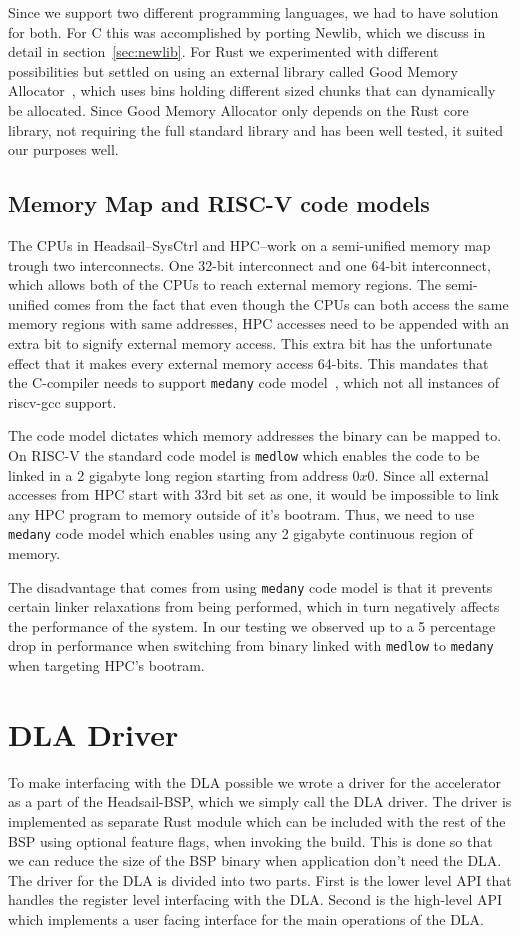 \documentclass[12pt,a4paper,english
]{tunithesis}
\begin{document}
Since we support two different programming languages, we had to have solution for both. For C this was accomplished by porting Newlib, which we discuss in detail in section~\ref{sec:newlib}. For Rust we experimented with different possibilities but settled on using an external library called Good Memory Allocator~\cite{galloc_memory_allocator}, which uses bins holding different sized chunks that can dynamically be allocated. Since Good Memory Allocator only depends on the Rust core library, not requiring the full standard library and has been well tested, it suited our purposes well.

\subsection{Memory Map and RISC-V code models}
The CPUs in Headsail--SysCtrl and HPC--work on a semi-unified memory map trough two interconnects. One 32-bit interconnect and one 64-bit interconnect, which allows both of the CPUs to reach external memory regions. The semi-unified comes from the fact that even though the CPUs can both access the same memory regions with same addresses, HPC accesses need to be appended with an extra bit to signify external memory access. This extra bit has the unfortunate effect that it makes every external memory access 64-bits. This mandates that the C-compiler needs to support \texttt{medany} code model~\cite{sifive_riscv_code_models}, which not all instances of riscv-gcc support.

The code model dictates which memory addresses the binary can be mapped to. On RISC-V the standard code model is \texttt{medlow} which enables the code to be linked in a 2 gigabyte long region starting from address $0x0$. Since all external accesses from HPC start with 33rd bit set as one, it would be impossible to link any HPC program to memory outside of it's bootram. Thus, we need to use \texttt{medany} code model which enables using any 2 gigabyte continuous region of memory.

The disadvantage that comes from using \texttt{medany} code model is that it prevents certain linker relaxations from being performed, which in turn negatively affects the performance of the system. In our testing we observed up to a 5 percentage drop in performance when switching from binary linked with \texttt{medlow} to \texttt{medany} when targeting HPC's bootram.

\section{DLA Driver}
To make interfacing with the DLA possible we wrote a driver for the accelerator as a part of the Headsail-BSP, which we simply call the DLA driver.
The driver is implemented as separate Rust module which can be included with the rest of the BSP using optional feature flags, when invoking the build. This is done so that we can reduce the size of the BSP binary when application don't need the DLA. The driver for the DLA is divided into two parts. First is the lower level API that handles the register level interfacing with the DLA. Second is the high-level API which implements a user facing interface for the main operations of the DLA.
\end{document}
